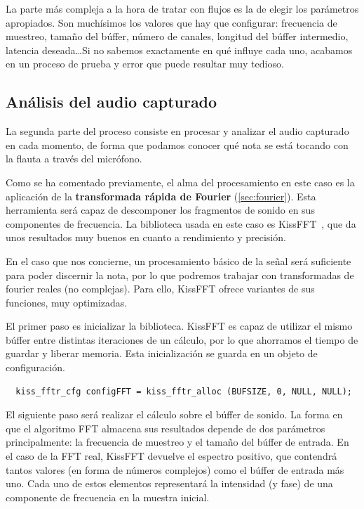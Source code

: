 La parte más compleja a la hora de tratar con flujos es la de elegir los
parámetros apropiados. Son muchísimos los valores que hay que configurar:
frecuencia de muestreo, tamaño del búffer, número de canales, longitud del
búffer intermedio, latencia deseada\ldots Si no sabemos exactamente en qué
influye cada uno, acabamos en un proceso de prueba y error que puede resultar
muy tedioso.

\subsection{Análisis del audio capturado}

La segunda parte del proceso consiste en procesar y analizar el audio capturado
en cada momento, de forma que podamos conocer qué nota se está tocando con la
flauta a través del micrófono.

Como se ha comentado previamente, el alma del procesamiento en este caso es la
aplicación de la \textbf{transformada rápida de Fourier}
(\ref{sec:fourier}). Esta herramienta será capaz de descomponer los fragmentos
de sonido en sus componentes de frecuencia. La biblioteca usada en este caso es
KissFFT~\cite{kissfft}, que da unos resultados muy buenos en cuanto a
rendimiento y precisión. 

En el caso que nos concierne, un procesamiento básico de la señal será
suficiente para poder discernir la nota, por lo que podremos trabajar con
transformadas de fourier reales (no complejas). Para ello, KissFFT ofrece
variantes de sus funciones, muy optimizadas.

El primer paso es inicializar la biblioteca. KissFFT es capaz de utilizar el
mismo búffer entre distintas iteraciones de un cálculo, por lo que ahorramos el
tiempo de guardar y liberar memoria. Esta inicialización se guarda en un objeto
de configuración.

\begin{verbatim}
  kiss_fftr_cfg configFFT = kiss_fftr_alloc (BUFSIZE, 0, NULL, NULL);
\end{verbatim}

El siguiente paso será realizar el cálculo sobre el búffer de sonido.  La forma
en que el algoritmo FFT almacena sus resultados depende de dos parámetros
principalmente: la frecuencia de muestreo y el tamaño del búffer de entrada. En
el caso de la FFT real, KissFFT devuelve el espectro positivo, que contendrá
tantos valores (en forma de números complejos) como el búffer de entrada más
uno. Cada uno de estos elementos representará la intensidad (y fase) de una
componente de frecuencia en la muestra inicial.

